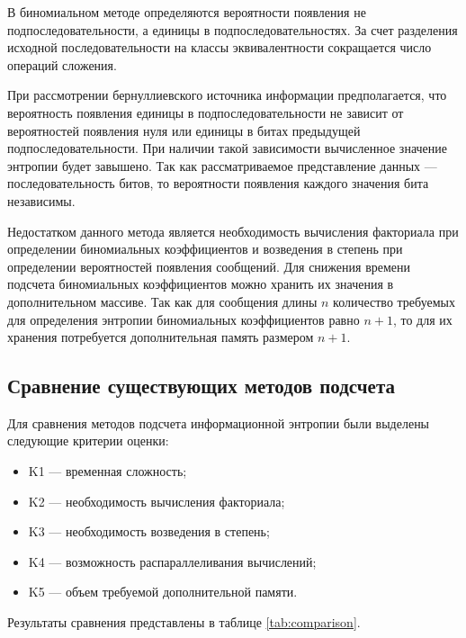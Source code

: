 В биномиальном методе определяются вероятности появления не подпоследовательности, а единицы в подпоследовательностях. За счет разделения исходной последовательности на классы эквивалентности сокращается число операций сложения.

При рассмотрении бернуллиевского источника информации предполагается, что вероятность появления единицы в подпоследовательности не зависит от вероятностей появления нуля или единицы в битах предыдущей подпоследовательности. При наличии такой зависимости вычисленное значение энтропии будет завышено. Так как рассматриваемое представление данных --- последовательность битов, то вероятности появления каждого значения бита независимы. 

Недостатком данного метода является необходимость вычисления факториала при определении биномиальных коэффициентов и возведения в степень при определении вероятностей появления сообщений. Для снижения времени подсчета биномиальных коэффициентов можно хранить их значения в дополнительном массиве. Так как для сообщения длины $n$ количество требуемых для определения энтропии биномиальных коэффициентов равно $n + 1$, то для их хранения потребуется дополнительная память размером $n + 1$.

\subsection{Сравнение существующих методов подсчета}

Для сравнения методов подсчета информационной энтропии были выделены следующие критерии оценки:

\begin{itemize}
	\item K1 --- временная сложность;
	\item K2 --- необходимость вычисления факториала;
	\item K3 --- необходимость возведения в степень;
	\item K4 --- возможность распараллеливания вычислений;
	\item K5 --- объем требуемой дополнительной памяти.
\end{itemize}

Результаты сравнения представлены в таблице \ref{tab:comparison}.

